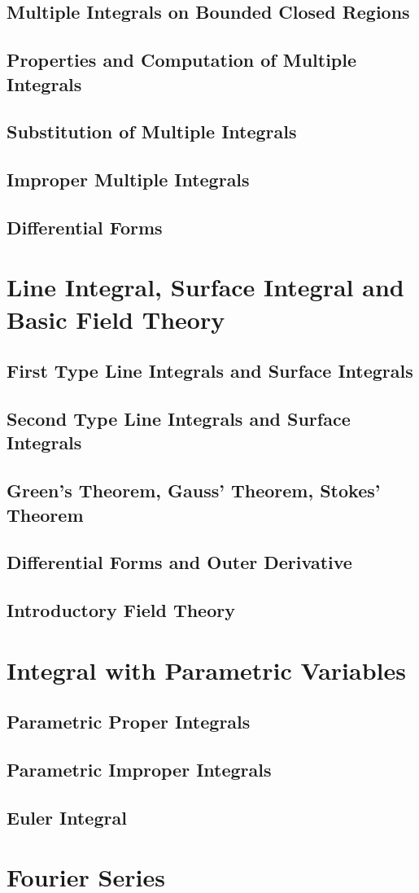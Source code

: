 \documentclass{article}
\newcommand{\0}{{\bf{0}}}
\begin{document}
\subsection{Multiple Integrals on Bounded Closed Regions}
\subsection{Properties and Computation of Multiple Integrals}
\subsection{Substitution of Multiple Integrals}
\subsection{Improper Multiple Integrals}
\subsection{Differential Forms}
\section{Line Integral, Surface Integral and Basic Field Theory}
\subsection{First Type Line Integrals and Surface Integrals}
\subsection{Second Type Line Integrals and Surface Integrals}
\subsection{Green's Theorem, Gauss' Theorem, Stokes' Theorem}
\subsection{Differential Forms and Outer Derivative}
\subsection{Introductory Field Theory}
\section{Integral with Parametric Variables}
\subsection{Parametric Proper Integrals}
\subsection{Parametric Improper Integrals}
\subsection{Euler Integral}
\section{Fourier Series}
\end{document}
